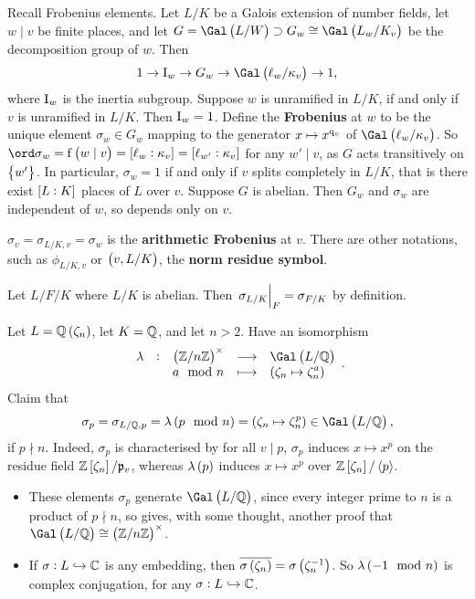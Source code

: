 Recall Frobenius elements. Let $ L / K $ be a Galois extension of number fields, let $ w \mid v $ be finite places, and let $ G = \Gal\br{L / W} \supset G_w \cong \Gal\br{L_w / K_v} $ be the decomposition group of $ w $. Then
$$ 1 \to \I_w \to G_w \to \Gal\br{\ell_w / \kappa_v} \to 1, $$
where $ \mathrm{I}_w $ is the inertia subgroup. Suppose $ w $ is unramified in $ L / K $, if and only if $ v $ is unramified in $ L / K $. Then $ \mathrm{I}_w = 1 $. Define the \textbf{Frobenius} at $ w $ to be the unique element $ \sigma_w \in G_w $ mapping to the generator $ x \mapsto x^{\mathrm{q}_v} $ of $ \Gal\br{\ell_w / \kappa_v} $. So $ \ord \sigma_w = \f\br{w \mid v} = \sbr{\ell_w : \kappa_v} = \sbr{\ell_{w'} : \kappa_v} $ for any $ w' \mid v $, as $ G $ acts transitively on $ \cbr{w'} $. In particular, $ \sigma_w = 1 $ if and only if $ v $ splits completely in $ L / K $, that is there exist $ \sbr{L : K} $ places of $ L $ over $ v $. Suppose $ G $ is abelian. Then $ G_w $ and $ \sigma_w $ are independent of $ w $, so depends only on $ v $.

\begin{notation*}
$ \sigma_v = \sigma_{L / K, v} = \sigma_w $ is the \textbf{arithmetic Frobenius} at $ v $. There are other notations, such as $ \phi_{L / K, v} $ or $ \br{v, L / K} $, the \textbf{norm residue symbol}.
\end{notation*}

\begin{remark*}
Let $ L / F / K $ where $ L / K $ is abelian. Then $ \left. \sigma_{L / K} \right|_F = \sigma_{F / K} $ by definition.
\end{remark*}

Let $ L = \QQ\br{\zeta_n} $, let $ K = \mathbb{Q} $, and let $ n > 2 $. Have an isomorphism
$$ \function[\lambda]{\br{\ZZ / n\ZZ}^\times}{\Gal\br{L / \QQ}}{a \mod n}{\br{\zeta_n \mapsto \zeta_n^a}}. $$
Claim that
$$ \sigma_p = \sigma_{L / \QQ, p} = \lambda\br{p \mod n} = \br{\zeta_n \mapsto \zeta_n^p} \in \Gal\br{L / \QQ}, $$
if $ p \nmid n $. Indeed, $ \sigma_p $ is characterised by for all $ v \mid p $, $ \sigma_p $ induces $ x \mapsto x^p $ on the residue field $ \ZZ\sbr{\zeta_n} / \ppp_v $, whereas $ \lambda\br{p} $ induces $ x \mapsto x^p $ over $ \ZZ\sbr{\zeta_n} / \abr{p} $.


\begin{remark*}
\hfill
\begin{itemize}
\item These elements $ \sigma_p $ generate $ \Gal\br{L / \QQ} $, since every integer prime to $ n $ is a product of $ p \nmid n $, so gives, with some thought, another proof that $ \Gal\br{L / \QQ} \cong \br{\ZZ / n\ZZ}^\times $.
\item If $ \sigma : L \hookrightarrow \mathbb{C} $ is any embedding, then $ \overline{\sigma\br{\zeta_n}} = \sigma\br{\zeta_n^{-1}} $. So $ \lambda\br{-1 \mod n} $ is complex conjugation, for any $ \sigma : L \hookrightarrow \mathbb{C} $.
\end{itemize}
\end{remark*}


